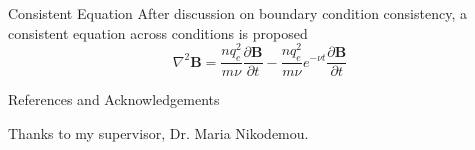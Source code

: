 \documentclass[final]{beamer}
\begin{document}
\begin{frame}{}
\begin{textblock}{19.5}
\vspace{-0.2cm}
\begin{block}{Consistent Equation}
	After discussion on boundary condition consistency, a consistent equation across conditions is proposed
	\begin{equation*}
		\nabla^2\mathbf{B}=\frac{nq_e^2}{m\nu}\frac{\partial \mathbf{B}}{\partial t}-\frac{nq_e^2}{m\nu}e^{-\nu t}\frac{\partial \mathbf{B}}{\partial t}
	\end{equation*}
\end{block}

\vspace{-0.2cm}
\begin{block}{References and Acknowledgements}
\begin{minipage}{0.9\linewidth}
     {     \printbibliography   %
     } 
\end{minipage}
\vspace{2ex}

Thanks to my supervisor, Dr. Maria Nikodemou.
\end{block}

\end{textblock}

\end{frame}
\end{document}
